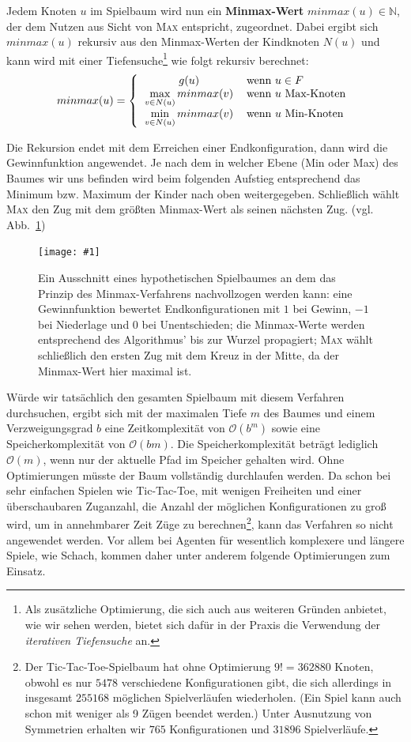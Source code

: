 \documentclass[a4paper,twoside]{scrartcl}
\newcommand\q[1]{\glqq #1\grqq}
\newcommand\g[4]{%
  \begin{figure}[!ht]
  \centering
  \texttt{[image: \#1]}
  \caption{#3\label{fig:#2}}
  \end{figure}}
\begin{document}
Jedem Knoten $u$ im Spielbaum wird nun ein \textbf{Minmax-Wert} $minmax(u) \in \mathbb{N}$, der dem Nutzen aus Sicht von \textsc{Max} entspricht, zugeordnet. Dabei ergibt sich $minmax(u)$ rekursiv aus den Minmax-Werten der Kindknoten $N(u)$ und kann wird mit einer Tiefensuche\footnote{Als zusätzliche Optimierung, die sich auch aus weiteren Gründen anbietet, wie wir sehen werden, bietet sich dafür in der Praxis die Verwendung der \textit{iterativen Tiefensuche} an.} wie folgt rekursiv berechnet:
\[
  minmax(u) = \left\{
  \begin{tabular}{cl}
    $g(u)$ & wenn $u \in F$\\
    $\max\limits_{v \in N(u)} minmax(v)$ & wenn $u$ Max-Knoten\\
    $\min\limits_{v \in N(u)} minmax(v)$ & wenn $u$ Min-Knoten
  \end{tabular}\right.
\]

Die Rekursion endet mit dem Erreichen einer Endkonfiguration, dann wird die Gewinnfunktion angewendet. Je nach dem in welcher Ebene (Min oder Max) des Baumes wir uns befinden wird beim folgenden Aufstieg entsprechend das Minimum bzw. Maximum der Kinder nach oben weitergegeben. Schließlich wählt \textsc{Max} den Zug mit dem größten Minmax-Wert als seinen nächsten Zug. (vgl. Abb.~\ref{fig:minmax})

\g{img/tic_minmax_2.pdf}{minmax}{Ein Ausschnitt eines hypothetischen Spielbaumes an dem das Prinzip des Minmax-Verfahrens nachvollzogen werden kann: eine Gewinnfunktion bewertet Endkonfigurationen mit $1$ bei Gewinn, $-1$ bei Niederlage und $0$ bei Unentschieden; die Minmax-Werte werden entsprechend des Algorithmus' bis zur Wurzel propagiert; \textsc{Max} wählt schließlich den ersten Zug mit dem Kreuz in der Mitte, da der Minmax-Wert hier maximal ist.}{.4}

Würde wir tatsächlich den gesamten Spielbaum mit diesem Verfahren durchsuchen, ergibt sich mit der maximalen Tiefe $m$ des Baumes und einem Verzweigungsgrad $b$ eine Zeitkomplexität von $\mathcal{O}(b^m)$ sowie eine Speicherkomplexität von $\mathcal{O}(bm)$. Die Speicherkomplexität beträgt lediglich $\mathcal{O}(m)$, wenn nur der aktuelle Pfad im Speicher gehalten wird. Ohne Optimierungen müsste der Baum vollständig durchlaufen werden. Da schon bei sehr einfachen Spielen wie Tic-Tac-Toe, mit wenigen Freiheiten und einer überschaubaren Zuganzahl, die Anzahl der möglichen Konfigurationen zu groß wird, um in annehmbarer Zeit Züge zu berechnen\footnote{Der Tic-Tac-Toe-Spielbaum hat ohne Optimierung $9! = 362880$ Knoten, obwohl es \q{nur} $5478$ verschiedene Konfigurationen gibt, die sich allerdings in insgesamt $255168$ möglichen Spielverläufen wiederholen. (Ein Spiel kann auch schon mit weniger als 9 Zügen beendet werden.) Unter Ausnutzung von Symmetrien erhalten wir $765$ Konfigurationen und $31896$ Spielverläufe.}, kann das Verfahren so nicht angewendet werden. Vor allem bei Agenten für wesentlich komplexere und längere Spiele, wie Schach, kommen daher unter anderem folgende Optimierungen zum Einsatz.
\end{document}
